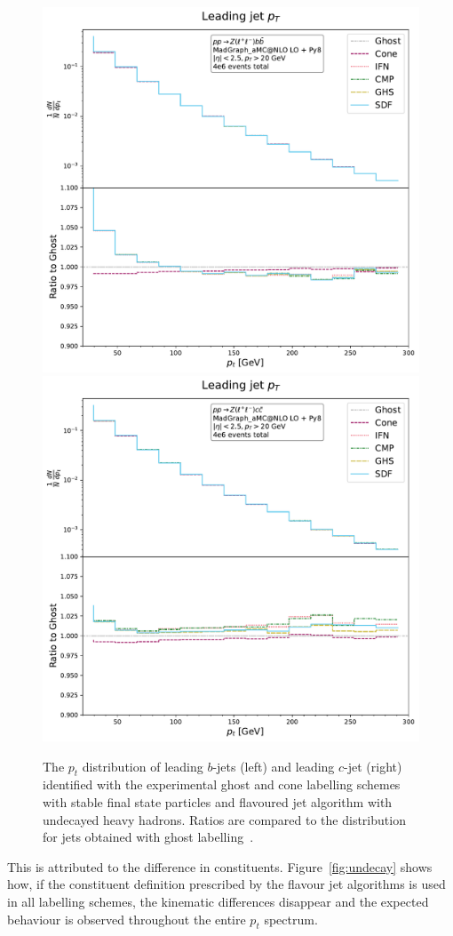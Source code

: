 \documentclass[10pt,a4paper]{book}
\begin{document}
\begin{figure}
    \centering
    \includegraphics[width=0.485\linewidth]{ftag/leadJetPt_decayed_b.pdf}
    \includegraphics[width=0.485\linewidth]{ftag/leadJetPt_decayed_c.pdf}
    \caption{The $p_t$ distribution of leading 
    $b$-jets (left) and leading $c$-jet (right) identified with
the experimental ghost and cone labelling schemes with stable final state particles and flavoured jet algorithm with undecayed heavy hadrons. Ratios are compared to the distribution for jets obtained with ghost labelling~\cite{Behring:2025ilo}.}
    \label{fig:decay}
\end{figure}

This is attributed to the difference in constituents. Figure~\ref{fig:undecay} shows how, if the constituent definition prescribed by the flavour jet algorithms is used in all labelling schemes, the kinematic differences disappear and the expected behaviour is observed throughout the entire $p_t$ spectrum.
\end{document}
